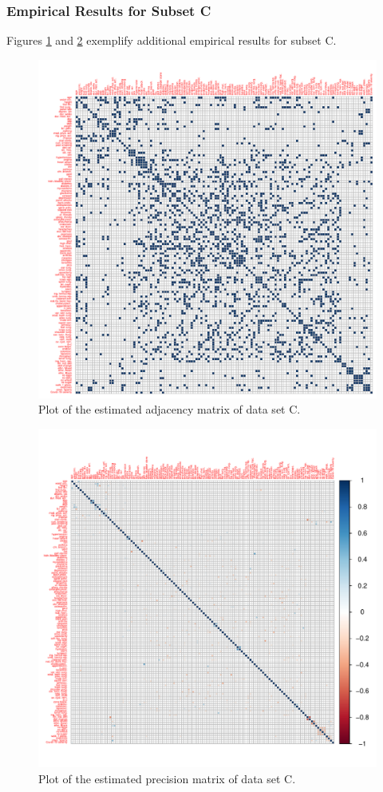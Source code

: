 \subsubsection*{Empirical Results for Subset C}

Figures \ref{fig:corrplot_admat_C} and \ref{fig:corrplot_omega_C} exemplify additional empirical results for subset C.

\begin{figure}[ht]
    \centering
    \includegraphics[width=1.0\textwidth]{Figures/corrplot_admat_C.pdf}
    \caption{Plot of the estimated adjacency matrix of data set C.}
    \label{fig:corrplot_admat_C}
\end{figure}

\begin{figure}
    \centering
    \includegraphics[width=1.0\textwidth]{Figures/corrplot_omega_C.pdf}
    \caption{Plot of the estimated precision matrix of data set C.}
    \label{fig:corrplot_omega_C}
\end{figure}
